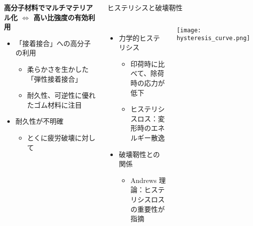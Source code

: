 \begin{columns}[totalwidth=.85\linewidth]
	\column{\textwidth}
		\begin{boxnote}
			\textbf{高分子材料でマルチマテリアル化 $\Leftrightarrow$ 高い比強度の有効利用}
			\begin{itemize}
				\item {\color{red} 「接着接合」}への高分子の利用
					\begin{itemize}
						\normalsize
						\item 柔らかさを生かした{\color{red} 「弾性接着接合」}
						\item 耐久性、可逆性に優れた\alert{ゴム材料に注目}
					\end{itemize}
				\item {\color{blue}耐久性が不明確}
					\begin{itemize}
						\normalsize
						\item とくに疲労破壊に対して
					\end{itemize}
			\end{itemize}
		\end{boxnote}

		\begin{itembox}[l]{ヒステリシスと破壊靭性}
			\begin{columns}[totalwidth=\linewidth]
					\begin{itemize}
						\item 力学的ヒステリシス
						\begin{itemize}
							\normalsize
							\item
							印荷時に比べて、除荷時の応力が低下
							\item
							ヒステリシスロス：変形時のエネルギー散逸
						\end{itemize}
						\item 破壊靭性との関係
						\begin{itemize}
							\normalsize
							\item
							Andrews 理論：ヒステリシスロスの重要性が指摘
						\end{itemize}
					\end{itemize}
					\centering
					\texttt{[image: hysteresis\_curve.png]}
				\end{columns}
		\end{itembox}


\end{columns}
